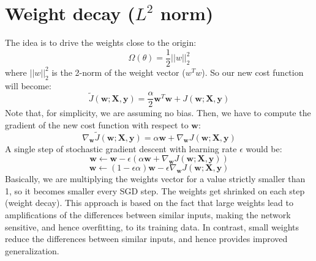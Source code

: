 \section{Weight decay ($L^2$ norm)}
The idea is to drive the weights close to the origin:
\[\Omega(\theta) = \frac{1}{2} ||w||_2^2\]
where $||w||_2^2$ is the 2-norm of the weight vector ($w^Tw$).\newline\newline
So our new cost function will become:
\[\tilde{J}(\textbf{w}; \textbf{X}, \textbf{y}) = \frac{\alpha}{2}\textbf{w}^T\textbf{w} + J(\textbf{w}; \textbf{X}, \textbf{y})\]
Note that, for simplicity, we are assuming no bias.\newline\newline
Then, we have to compute the gradient of the new cost function with respect to $\textbf{w}$:
\[\nabla_\textbf{w} \tilde{J}(\textbf{w}; \textbf{X}, \textbf{y}) = \alpha \textbf{w} + \nabla_\textbf{w} J(\textbf{w}; \textbf{X}, \textbf{y})\]
A single step of stochastic gradient descent with learning rate $\epsilon$ would be:
\[\textbf{w} \gets \textbf{w} - \epsilon(\alpha \textbf{w} + \nabla_\textbf{w} J(\textbf{w}; \textbf{X}, \textbf{y}))\]
\[\textbf{w} \gets (1 - \epsilon\alpha)\textbf{w} - \epsilon \nabla_\textbf{w} J(\textbf{w}; \textbf{X}, \textbf{y})\]
Basically, we are multiplying the weights vector for a value strictly smaller than 1, so it becomes smaller every SGD step. The weights get shrinked on each step (weight decay). This approach is based on the fact that large weights lead to amplifications of the differences between similar inputs, making the network sensitive, and hence overfitting, to its training data. In contrast, small weights reduce the differences between similar inputs, and hence provides improved generalization.


